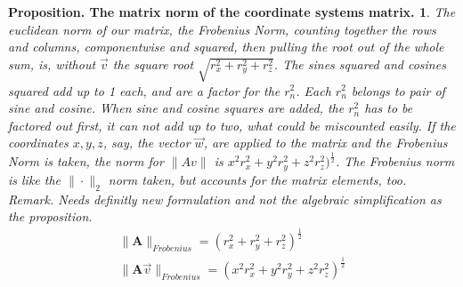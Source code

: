 \documentclass[a4paper]{article}
\begin{document}
\newtheorem{PropositionMatrixNorm}{Proposition. The matrix norm of the coordinate systems matrix.}
\begin{PropositionMatrixNorm}
\label{proposition_matrix_norm}
The euclidean norm of our matrix, the Frobenius Norm, counting together the rows and columns, componentwise and squared, then pulling the root out of the whole sum, is, without $\vec{v}$ the square root $\sqrt{r_{x}^{2}+r_{y}^{2}+r_{z}^{2}}$. The sines squared and cosines squared add up to 1 each, and are a factor for the $r_{n}^{2}$. Each $r_{n}^{2}$ belongs to pair of sine and cosine. When sine and cosine squares are added, the $r_{n}^{2}$ has to be factored out first, it can not add up to two, what could be miscounted easily. If the coordinates $x,y,z$, say, the vector $\vec{w}$, are applied to the matrix and the Frobenius Norm is taken, the norm for $\|Av\|$ is $x^{2}r_{x}^{2}+y^{2}r_{y}^{2}+z^{2}r_{z}^{2})^{\frac{1}{2}}$. The Frobenius norm is like the $\|\cdot\|_{2}$ norm taken, but accounts for the matrix elements, too.\\

Remark. Needs definitly new formulation and not the algebraic simplification as the proposition.\\

\begin{displaymath}
\begin{align}
\|\boldsymbol{A}\|_{Frobenius} = (r_{x}^{2}+r_{y}^{2}+r_{z}^{2})^{\frac{1}{2}}\\
\|\boldsymbol{A}\vec{v}\|_{Frobenius} = (x^{2}r_{x}^{2}+y^{2}r_{y}^{2}+z^{2}r_{z}^{2})^{\frac{1}{2}}
\end{align}
\end{displaymath}
\end{PropositionMatrixNorm}
\end{document}

